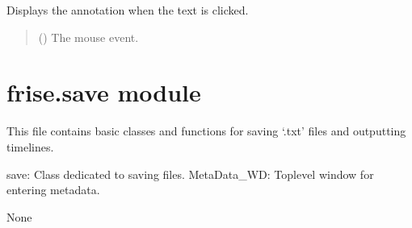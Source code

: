 \documentclass[letterpaper,10pt,english]{sphinxmanual}
\begin{document}
\begin{fulllineitems}
\label{\detokenize{frise:frise.fonctions_frise.on_text_click}}
\pysigstartsignatures
{}
\pysigstopsignatures
\sphinxAtStartPar
Displays the annotation when the text is clicked.
\begin{quote}\begin{description}
\sphinxAtStartPar
{} () \textendash{} The mouse event.

\end{description}\end{quote}

\end{fulllineitems}



\section{frise.save module}
\label{\detokenize{frise:module-frise.save}}\label{\detokenize{frise:frise-save-module}}
\sphinxAtStartPar
This file contains basic classes and functions for saving ‘.txt’ files and outputting timelines.
\begin{description}
\sphinxAtStartPar
save: Class dedicated to saving files.
MetaData\_WD: Toplevel window for entering metadata.

\sphinxAtStartPar
None

\end{description}
\end{document}
